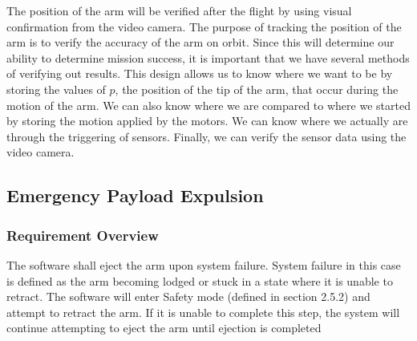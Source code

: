 \documentclass[letterpaper,10pt]{article}
\begin{document}
The position of the arm will be verified after the flight by using visual confirmation from the video 
camera. The purpose of tracking the position of the arm is to verify the accuracy of the arm on orbit. 
Since this will determine our ability to determine mission success, it is important that we have several 
methods of verifying out results. This design allows us to know where we want to be by storing the values
 of \(p\), the position of the tip of the arm, that occur during the motion of the arm. We can also know 
where we are compared to where we started by storing the motion applied by the motors. We can know where 
we actually are through the triggering of sensors. Finally, we can verify the sensor data using the video
 camera.

\subsection{Emergency Payload Expulsion}
\subsubsection{Requirement Overview}
The software shall eject the arm upon system failure. 
System failure in this case is defined as the arm becoming lodged or stuck in a state where it is unable to retract.
The software will enter Safety mode (defined in section 2.5.2) and attempt to retract the arm. If it is unable to complete this step,
 the system will continue attempting to eject the arm until ejection is completed
\end{document}

